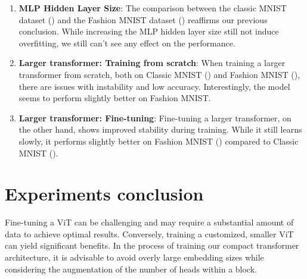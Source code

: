 \begin{enumerate}
    \item \textbf{MLP Hidden Layer Size}: The comparison between the classic MNIST dataset () and the Fashion MNIST dataset () reaffirms our previous conclusion. While increasing the MLP hidden layer size still not induce overfitting, we still can't see any effect on the performance.
    
    \item \textbf{Larger transformer: Training from scratch}:  When training a larger transformer from scratch, both on Classic MNIST () and Fashion MNIST (), there are issues with instability and low accuracy. Interestingly, the model seems to perform slightly better on Fashion MNIST.
    
    \item \textbf{Larger transformer: Fine-tuning}: Fine-tuning a larger transformer, on the other hand, shows improved stability during training. While it still learns slowly, it performs slightly better on Fashion MNIST () compared to Classic MNIST ().
\end{enumerate}

\section{Experiments conclusion}
Fine-tuning a ViT can be challenging and may require a substantial amount of data to achieve optimal results. Conversely, training a customized, smaller ViT can yield significant benefits. In the process of training our compact transformer architecture, it is advisable to avoid overly large embedding sizes while considering the augmentation of the number of heads within a block.